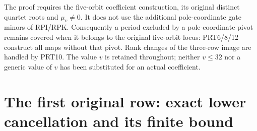 \documentclass[11pt,a4paper]{article}
\begin{document}
The proof requires the five-orbit coefficient construction, its original
distinct quartet roots and $\mu_v\ne0$. It does not use the additional
pole-coordinate gate minors of RPI/RPK. Consequently a period excluded
by a pole-coordinate pivot remains covered when it belongs to the
original five-orbit locus: PRT6/8/12 construct all maps without that
pivot. Rank changes of the three-row image are handled by PRT10.
The value $v$ is retained throughout; neither $v\le32$ nor a generic
value of $v$ has been substituted for an actual coefficient.

\label{MPBUILD:PRT_CONNECTING_ENDPOINT_RETURN:end}
\label{MTBUILD:PRT_COMPLETE_PREREQUISITE:end}

\clearpage
\label{MTBUILD:FRG_COMPLETE_PREREQUISITE:start}
\clearpage
\label{MPBUILD:FIRST_ROW_PROOF:start}
\section{The first original row: exact lower cancellation and its finite bound}
\label{sec:FRG}
\end{document}
